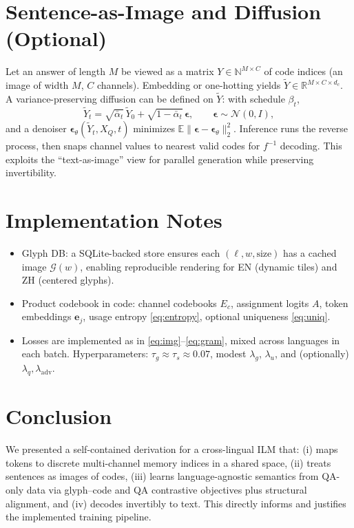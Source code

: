 \documentclass[11pt]{article}
\begin{document}
\section{Sentence-as-Image and Diffusion (Optional)}
Let an answer of length \(M\) be viewed as a matrix \(Y\in\mathbb{N}^{M\times C}\) of code indices (an image of width \(M\), \(C\) channels). Embedding or one-hotting yields \(\tilde{Y}\in\mathbb{R}^{M\times C\times d_c}\). A variance-preserving diffusion can be defined on \(\tilde{Y}\): with schedule \(\beta_t\),
\begin{equation}
  \tilde{Y}_t= \sqrt{\bar{\alpha}_t}\,\tilde{Y}_0 + \sqrt{1-\bar{\alpha}_t}\,\bm{\epsilon},\qquad \bm{\epsilon}\sim\mathcal{N}(0,I),
\end{equation}
and a denoiser \(\bm{\epsilon}_\theta(\tilde{Y}_t, X_Q, t)\) minimizes \(\mathbb{E}\lVert \bm{\epsilon}-\bm{\epsilon}_\theta\rVert_2^2\). Inference runs the reverse process, then snaps channel values to nearest valid codes for \(f^{-1}\) decoding. This exploits the “text-as-image” view for parallel generation while preserving invertibility.

\section{Implementation Notes}
\begin{itemize}
  \item Glyph DB: a SQLite-backed store ensures each \((\ell, w, \text{size})\) has a cached image \(\mathcal{G}(w)\), enabling reproducible rendering for EN (dynamic tiles) and ZH (centered glyphs).
  \item Product codebook in code: channel codebooks \(E_c\), assignment logits \(A\), token embeddings \(\mathbf{e}_j\), usage entropy \eqref{eq:entropy}, optional uniqueness \eqref{eq:uniq}.
  \item Losses are implemented as in \eqref{eq:img}--\eqref{eq:gram}, mixed across languages in each batch. Hyperparameters: \(\tau_g\approx\tau_s\approx 0.07\), modest \(\lambda_g\), \(\lambda_u\), and (optionally) \(\lambda_q,\lambda_{\text{adv}}\).
\end{itemize}

\section{Conclusion}
We presented a self-contained derivation for a cross-lingual ILM that: (i) maps tokens to discrete multi-channel memory indices in a shared space, (ii) treats sentences as images of codes, (iii) learns language-agnostic semantics from QA-only data via glyph--code and QA contrastive objectives plus structural alignment, and (iv) decodes invertibly to text. This directly informs and justifies the implemented training pipeline.
\end{document}
